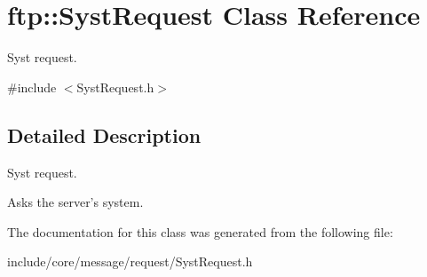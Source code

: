 \hypertarget{classftp_1_1_syst_request}{\section{ftp\-:\-:Syst\-Request Class Reference}
\label{classftp_1_1_syst_request}
}


Syst request.  




{\ttfamily \#include $<$Syst\-Request.\-h$>$}



\subsection{Detailed Description}
Syst request. 

Asks the server's system. 

The documentation for this class was generated from the following file\-:\begin{DoxyCompactItemize}
\item 
include/core/message/request/Syst\-Request.\-h\end{DoxyCompactItemize}
